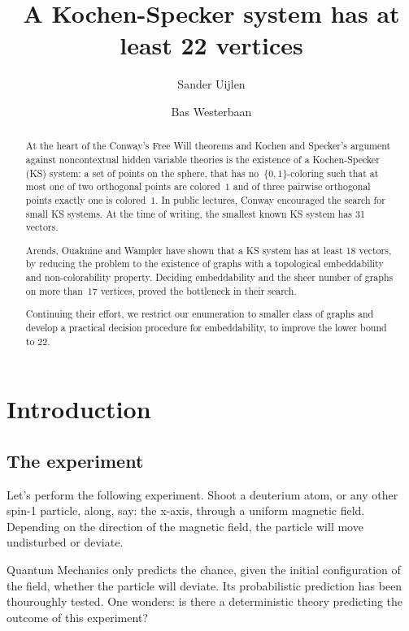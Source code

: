 \documentclass[a4paper]{article}
\title{A Kochen-Specker system has at least 22 vertices}
\author{Sander Uijlen}
\author{Bas Westerbaan}
\affil{Institute for Computing and Information Sciences\\
       Radboud Universiteit Nijmegen\\
   \{\texttt{suijlen},\texttt{bwesterb}\}\texttt{@cs.ru.nl}}
\theoremstyle{definition}
\theoremstyle{remark}
\begin{document}
\maketitle

\begin{abstract}
    At the heart of the Conway's Free Will theorems and Kochen and Specker's
        argument against noncontextual hidden variable theories
    is the existence of a Kochen-Specker (KS) system:
    a set of points on the sphere,
    that has no~$\{0,1\}$-coloring such that
    at most one of two orthogonal points are colored~$1$
    and of three pairwise orthogonal points exactly one
    is colored~$1$.
    In public lectures, Conway encouraged the search for small
    KS systems.  
    At the time of writing, the smallest known
    KS system has 31 vectors.  

    Arends, Ouaknine and Wampler have shown that a KS system has at least
    18 vectors, by reducing the problem to the existence of graphs
    with a topological embeddability and non-colorability property.
    Deciding embeddability and the sheer number of graphs on more than~$17$
    vertices, proved the bottleneck in their search.

    Continuing their effort, we restrict our enumeration to smaller class of
    graphs and develop a practical decision procedure for embeddability, to
    improve the lower bound to 22.
\end{abstract}
    
\section{Introduction}

\subsection{The experiment}

Let's perform the following experiment.  Shoot a deuterium atom,
or any other spin-1 particle,
along, say: the x-axis, through a uniform magnetic field.
Depending on the direction of the magnetic field,
the particle will move undisturbed
or deviate.

Quantum Mechanics only predicts the chance, given the initial configuration
of the field, whether the particle will deviate.
Its probabilistic prediction has been thouroughly tested.
One wonders: is there a deterministic theory predicting the
outcome of this experiment?
\end{document}
